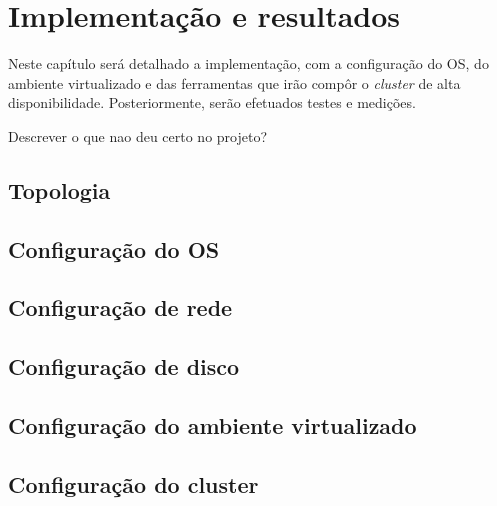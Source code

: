\chapter{Implementação e resultados}
\label{cap:implementacaoresultados}

Neste capítulo será detalhado a implementação, com a configuração do \ac{OS}, do ambiente virtualizado e das ferramentas que irão compôr o
\textit{cluster} de alta disponibilidade. Posteriormente, serão efetuados testes e medições.

Descrever o que nao deu certo no projeto?

\section{Topologia}


\section{Configuração do \ac{OS}}


\section{Configuração de rede}


\section{Configuração de disco}


\section{Configuração do ambiente virtualizado}


\section{Configuração do cluster}

